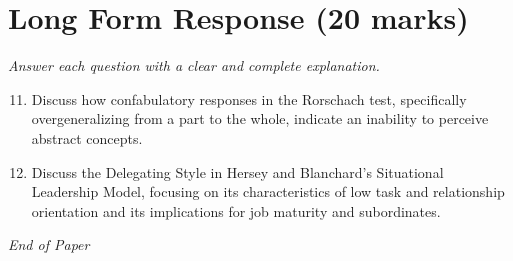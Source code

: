 \documentclass[12pt]{article}
\begin{document}
\section*{Long Form Response (20 marks)}
\textit{Answer each question with a clear and complete explanation.}
\begin{enumerate}[label=\arabic*.]
\setcounter{enumi}{10}
\item Discuss how confabulatory responses in the Rorschach test, specifically overgeneralizing
from a part to the whole, indicate an inability to perceive abstract concepts.
\item Discuss the Delegating Style in Hersey and Blanchard's Situational Leadership Model,
focusing on its characteristics of low task and relationship orientation and its
implications for job maturity and subordinates.
\end{enumerate}

\vfill
\noindent\textit{End of Paper}
\end{document}
